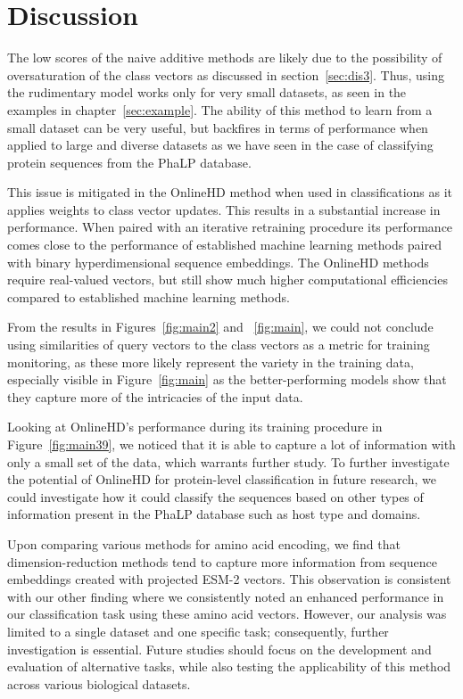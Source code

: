 \section{Discussion}
The low scores of the naive additive methods are likely due to the possibility of oversaturation of the class vectors as discussed in section~\ref{sec:dis3}. Thus, using the rudimentary model works only for very small datasets, as seen in the examples in chapter~\ref{sec:example}. The ability of this method to learn from a small dataset can be very useful, but backfires in terms of performance when applied to large and diverse datasets as we have seen in the case of classifying protein sequences from the PhaLP database.

This issue is mitigated in the OnlineHD method when used in classifications as it applies weights to class vector updates. This results in a substantial increase in performance. When paired with an iterative retraining procedure its performance comes close to the performance of established machine learning methods paired with binary hyperdimensional sequence embeddings. The OnlineHD methods require real-valued vectors, but still show much higher computational efficiencies compared to established machine learning methods.

From the results in Figures~\ref{fig:main2} and ~\ref{fig:main}, we could not conclude using similarities of query vectors to the class vectors as a metric for training monitoring, as these more likely represent the variety in the training data, especially visible in Figure~\ref{fig:main} as the better-performing models show that they capture more of the intricacies of the input data.

Looking at OnlineHD's performance during its training procedure in Figure~\ref{fig:main39}, we noticed that it is able to capture a lot of information with only a small set of the data, which warrants further study. To further investigate the potential of OnlineHD for protein-level classification in future research, we could investigate how it could classify the sequences based on other types of information present in the PhaLP database such as host type and domains.

Upon comparing various methods for amino acid encoding, we find that dimension-reduction methods tend to capture more information from sequence embeddings created with projected ESM-2 vectors. This observation is consistent with our other finding where we consistently noted an enhanced performance in our classification task using these amino acid vectors. However, our analysis was limited to a single dataset and one specific task; consequently, further investigation is essential. Future studies should focus on the development and evaluation of alternative tasks, while also testing the applicability of this method across various biological datasets.

